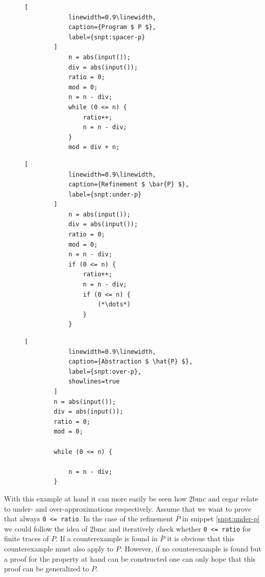 \begin{figure}
    \centering
    \begin{minipage}{.45\linewidth}
        \begin{lstlisting}[
            linewidth=0.9\linewidth,
            caption={Program $ P $},
            label={snpt:spacer-p}
        ]
            n = abs(input());
            div = abs(input());
            ratio = 0;
            mod = 0;
            n = n - div;
            while (0 <= n) {
                ratio++;
                n = n - div;
            }
            mod = div + n;
        \end{lstlisting}
    \end{minipage}

    \begin{minipage}[t]{.45\linewidth}
        \begin{lstlisting}[
            linewidth=0.9\linewidth,
            caption={Refinement $ \bar{P} $},
            label={snpt:under-p}
        ]
            n = abs(input());
            div = abs(input());
            ratio = 0;
            mod = 0;
            n = n - div;
            if (0 <= n) {
                ratio++;
                n = n - div;
                if (0 <= n) {
                    (*\dots*)
                }
            }
        \end{lstlisting}
    \end{minipage}\hspace{0.1\linewidth}%
    \begin{minipage}[t]{.45\linewidth}
        \begin{lstlisting}[
            linewidth=0.9\linewidth,
            caption={Abstraction $ \hat{P} $},
            label={snpt:over-p},
            showlines=true
        ]
        n = abs(input());
        div = abs(input());
        ratio = 0;
        mod = 0;

        while (0 <= n) {

            n = n - div;
        }

        \end{lstlisting}
    \end{minipage}
\end{figure}

With this example at hand it can more easily be seen how \gls{2bmc} and \gls{cegar} relate to under- and over-approximations respectively.
Assume that we want to prove that always \lstinline{0 <= ratio}.
In the case of the refinement $ \bar{P} $ in snippet \ref{snpt:under-p} we could follow the idea of \gls{2bmc} and iteratively check whether \lstinline{0 <= ratio} for finite traces of $ P $.
If a counterexample is found in $ \bar{P} $ it is obvious that this counterexample must also apply to $ P $.
However, if no counterexample is found but a proof for the property at hand can be constructed one can only hope that this proof can be generalized to $ P $.

